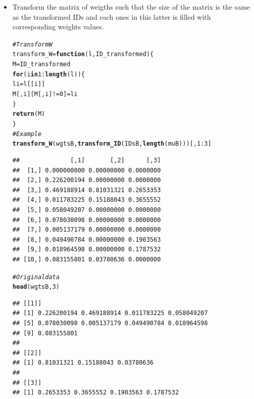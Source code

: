 \documentclass{llncs}\usepackage[]{graphicx}\usepackage[]{color}
\makeatletter
\newcommand{\hlnum}[1]{\textcolor[rgb]{0.686,0.059,0.569}{#1}}%
\newcommand{\hlcom}[1]{\textcolor[rgb]{0.678,0.584,0.686}{\textit{#1}}}%
\newcommand{\hlopt}[1]{\textcolor[rgb]{0,0,0}{#1}}%
\newcommand{\hlstd}[1]{\textcolor[rgb]{0.345,0.345,0.345}{#1}}%
\newcommand{\hlkwa}[1]{\textcolor[rgb]{0.161,0.373,0.58}{\textbf{#1}}}%
\newcommand{\hlkwb}[1]{\textcolor[rgb]{0.69,0.353,0.396}{#1}}%
\newcommand{\hlkwc}[1]{\textcolor[rgb]{0.333,0.667,0.333}{#1}}%
\newcommand{\hlkwd}[1]{\textcolor[rgb]{0.737,0.353,0.396}{\textbf{#1}}}%
\newenvironment{kframe}{%
 \def\at@end@of@kframe{}%
 \ifinner\ifhmode%
  \def\at@end@of@kframe{\end{minipage}}%
  \begin{minipage}{\columnwidth}%
 \fi\fi%
 \def\FrameCommand##1{\hskip\@totalleftmargin \hskip-\fboxsep
 \colorbox{shadecolor}{##1}\hskip-\fboxsep
     \hskip-\linewidth \hskip-\@totalleftmargin \hskip\columnwidth}%
 \MakeFramed {\advance\hsize-\width
   \@totalleftmargin\z@ \linewidth\hsize
   \@setminipage}}%
 {\par\unskip\endMakeFramed%
 \at@end@of@kframe}
\newenvironment{knitrout}{}{} %
\makeatother
\begin{document}
\begin {itemize}
\begin{knitrout}
\begin{kframe}
\begin{lstlisting}[basicstyle=\ttfamily,breaklines=true]
## [[1]]
## [1]  2  7  6  3  4  5  9  8 10
## 
## [[2]]
## [1] 10  3  4
## 
## [[3]]
## [1] 3 9 4 8
\end{lstlisting}
\end{kframe}
\end{knitrout}
\item Transform the matrix of weigths such that the size of the matrix is the same as the transformed IDs and each ones in this latter is filled with corresponding weights values.
\begin{knitrout}
\color{fgcolor}\begin{kframe}
\begin{alltt}
\hlcom{# Transform W }
\hlstd{transform_W} \hlkwb{=} \hlkwa{function}\hlstd{(}\hlkwc{l}\hlstd{,}\hlkwc{ID_transformed}\hlstd{)\{}
  \hlstd{M}\hlkwb{=}\hlstd{ID_transformed}
  \hlkwa{for} \hlstd{(i} \hlkwa{in} \hlnum{1}\hlopt{:}\hlkwd{length}\hlstd{(l))\{}
    \hlstd{li}\hlkwb{=}\hlstd{l[[i]]}
    \hlstd{M[,i][M[,i]} \hlopt{!=} \hlnum{0}\hlstd{]}\hlkwb{=}\hlstd{li}
  \hlstd{\}}
  \hlkwd{return}\hlstd{(M)}
\hlstd{\}}
\hlcom{# Example}
\hlkwd{transform_W}\hlstd{(wgtsB,}\hlkwd{transform_ID}\hlstd{(IDsB,}\hlkwd{length}\hlstd{(muB)))[,}\hlnum{1}\hlopt{:}\hlnum{3}\hlstd{]}
\end{alltt}
\begin{lstlisting}[basicstyle=\ttfamily,breaklines=true]
##              [,1]       [,2]      [,3]
##  [1,] 0.000000000 0.00000000 0.0000000
##  [2,] 0.226200194 0.00000000 0.0000000
##  [3,] 0.469188914 0.81031321 0.2653353
##  [4,] 0.011783225 0.15188043 0.3655552
##  [5,] 0.058049207 0.00000000 0.0000000
##  [6,] 0.078030098 0.00000000 0.0000000
##  [7,] 0.005137179 0.00000000 0.0000000
##  [8,] 0.049490784 0.00000000 0.1903563
##  [9,] 0.018964598 0.00000000 0.1787532
## [10,] 0.083155801 0.03780636 0.0000000
\end{lstlisting}
\begin{alltt}
\hlcom{# Original data}
\hlkwd{head}\hlstd{(wgtsB,}\hlnum{3}\hlstd{)}
\end{alltt}
\begin{lstlisting}[basicstyle=\ttfamily,breaklines=true]
## [[1]]
## [1] 0.226200194 0.469188914 0.011783225 0.058049207
## [5] 0.078030098 0.005137179 0.049490784 0.018964598
## [9] 0.083155801
## 
## [[2]]
## [1] 0.81031321 0.15188043 0.03780636
## 
## [[3]]
## [1] 0.2653353 0.3655552 0.1903563 0.1787532
\end{lstlisting}
\end{kframe}
\end{knitrout}

\end{itemize}
\end{document}
